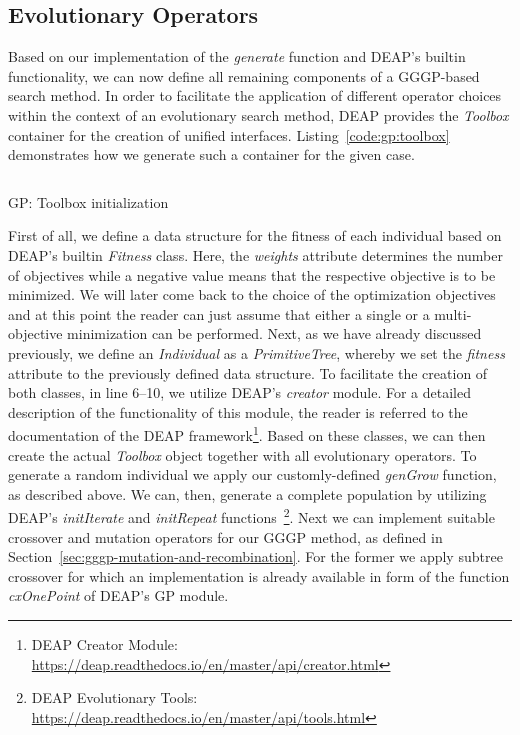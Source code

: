 \subsection{Evolutionary Operators}
Based on our implementation of the \emph{generate} function and DEAP's builtin functionality, we can now define all remaining components of a  GGGP-based search method.
In order to facilitate the application of different operator choices within the context of an evolutionary search method, DEAP provides the \emph{Toolbox} container for the creation of unified interfaces.
Listing~\ref{code:gp:toolbox} demonstrates how we generate such a container for the given case.
\begin{listing}
	\inputminted[linenos]{python}{evostencils/gp/toolbox.py}
	\caption{GP: Toolbox initialization}
	\label{code:gp:toolbox}
\end{listing}
First of all, we define a data structure for the fitness of each individual based on DEAP's builtin \emph{Fitness} class.
Here, the \emph{weights} attribute determines the number of objectives while a negative value means that the respective objective is to be minimized.
We will later come back to the choice of the optimization objectives and at this point the reader can just assume that either a single or a multi-objective minimization can be performed.
Next, as we have already discussed previously, we define an \emph{Individual} as a \emph{PrimitiveTree}, whereby we set the \emph{fitness} attribute to the previously defined data structure.
To facilitate the creation of both classes, in line 6--10, we utilize DEAP's \emph{creator} module.
For a detailed description of the functionality of this module, the reader is referred to the documentation of the DEAP framework\footnote{DEAP Creator Module: \url{https://deap.readthedocs.io/en/master/api/creator.html}}.
Based on these classes, we can then create the actual \emph{Toolbox} object together with all evolutionary operators.
To generate a random individual we apply our customly-defined \emph{genGrow} function, as described above.
We can, then, generate a complete population by utilizing DEAP's \emph{initIterate} and \emph{initRepeat} functions~\footnote{DEAP Evolutionary Tools: \url{https://deap.readthedocs.io/en/master/api/tools.html}}.
Next we can implement suitable crossover and mutation operators for our GGGP method, as defined in Section~\ref{sec:gggp-mutation-and-recombination}.
For the former we apply subtree crossover for which an implementation is already available in form of the function \emph{cxOnePoint} of DEAP's GP module.
